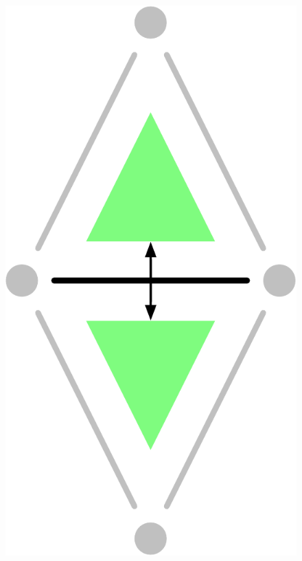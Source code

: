 \begin{figure}[tbp]
{\includegraphics[scale=0.18]{figs/1-simplex-star}}
\quad
\subfloat[]{
}
\end{figure}
